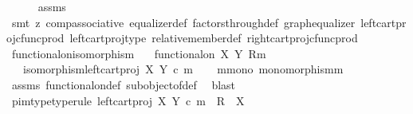 \begin{isabellebody}
\ \ \ \ \isamarkupfalse%
\ assms\ \ \isanewline
\ \ \ \ \isamarkupfalse%
\ {\isacharparenleft}{\kern0pt}smt\ {\isacharparenleft}{\kern0pt}z{}{\isacharparenright}{\kern0pt}\ comp{\isacharunderscore}{\kern0pt}associative{}\ equalizer{\isacharunderscore}{\kern0pt}def\ factors{\isacharunderscore}{\kern0pt}through{\isacharunderscore}{\kern0pt}def{}\ graph{\isacharunderscore}{\kern0pt}equalizer{}\ left{\isacharunderscore}{\kern0pt}cart{\isacharunderscore}{\kern0pt}proj{\isacharunderscore}{\kern0pt}cfunc{\isacharunderscore}{\kern0pt}prod\ left{\isacharunderscore}{\kern0pt}cart{\isacharunderscore}{\kern0pt}proj{\isacharunderscore}{\kern0pt}type\ relative{\isacharunderscore}{\kern0pt}member{\isacharunderscore}{\kern0pt}def{}\ right{\isacharunderscore}{\kern0pt}cart{\isacharunderscore}{\kern0pt}proj{\isacharunderscore}{\kern0pt}cfunc{\isacharunderscore}{\kern0pt}prod{\isacharparenright}{\kern0pt}\isanewline
{}\isamarkupfalse%
%
\endisatagproof
{\isafoldproof}%
%
\isadelimproof
\isanewline
%
\endisadelimproof
\isanewline
{}\isamarkupfalse%
\ functional{\isacharunderscore}{\kern0pt}on{\isacharunderscore}{\kern0pt}isomorphism{\isacharcolon}{\kern0pt}\isanewline
\ \ \ {\isachardoublequoteopen}functional{\isacharunderscore}{\kern0pt}on\ X\ Y\ {\isacharparenleft}{\kern0pt}R{\isacharcomma}{\kern0pt}m{\isacharparenright}{\kern0pt}{\isachardoublequoteclose}\isanewline
\ \ \ {\isachardoublequoteopen}isomorphism{\isacharparenleft}{\kern0pt}left{\isacharunderscore}{\kern0pt}cart{\isacharunderscore}{\kern0pt}proj\ X\ Y\ {\isasymcirc}\isactrlsub c\ m{\isacharparenright}{\kern0pt}{\isachardoublequoteclose}\isanewline
%
\isadelimproof
%
\endisadelimproof
%
\isatagproof
{}\isamarkupfalse%
{\isacharminus}{\kern0pt}\isanewline
\ \ \isamarkupfalse%
\ m{\isacharunderscore}{\kern0pt}mono{\isacharcolon}{\kern0pt}\ {\isachardoublequoteopen}monomorphism{\isacharparenleft}{\kern0pt}m{\isacharparenright}{\kern0pt}{\isachardoublequoteclose}\isanewline
\ \ \ \ \isamarkupfalse%
\ assms\ functional{\isacharunderscore}{\kern0pt}on{\isacharunderscore}{\kern0pt}def\ subobject{\isacharunderscore}{\kern0pt}of{\isacharunderscore}{\kern0pt}def{}\ \isamarkupfalse%
\ blast\isanewline
\ \ \isamarkupfalse%
\ pi{}{\isacharunderscore}{\kern0pt}m{\isacharunderscore}{\kern0pt}type{\isacharbrackleft}{\kern0pt}type{\isacharunderscore}{\kern0pt}rule{\isacharbrackright}{\kern0pt}{\isacharcolon}{\kern0pt}\ {\isachardoublequoteopen}left{\isacharunderscore}{\kern0pt}cart{\isacharunderscore}{\kern0pt}proj\ X\ Y\ {\isasymcirc}\isactrlsub c\ m\ {\isacharcolon}{\kern0pt}\ R\ {\isasymrightarrow}\ X{\isachardoublequoteclose}\isanewline

\end{isabellebody}
